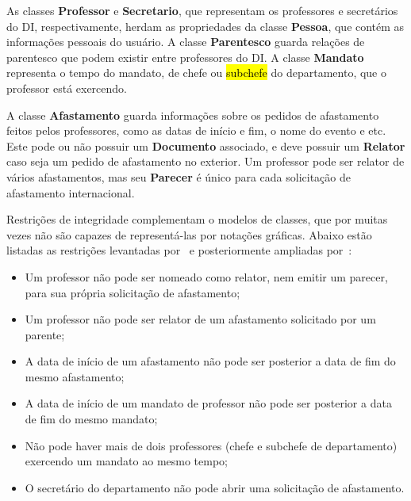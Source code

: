 As classes \textbf{Professor} e \textbf{Secretario}, que representam os professores
e secretários do DI, respectivamente, herdam as propriedades da classe \textbf{Pessoa},
que contém as informações pessoais do usuário. A classe \textbf{Parentesco} 
guarda relações de parentesco que podem existir entre professores do DI.
A classe \textbf{Mandato} representa o tempo do mandato, de chefe ou \hl{subchefe} do departamento,
que o professor está exercendo.


A classe \textbf{Afastamento} guarda informações sobre os pedidos de afastamento
feitos pelos professores, como as datas de início e fim, o nome do evento e etc.
Este pode ou não possuir um \textbf{Documento} associado, e deve possuir um \textbf{Relator}
caso seja um pedido de afastamento no exterior. Um professor pode ser relator de vários afastamentos,
mas seu \textbf{Parecer} é único para cada solicitação de afastamento internacional.


Restrições de integridade complementam o modelos de classes, que por muitas vezes não são
capazes de representá-las por notações gráficas. Abaixo estão listadas as restrições
levantadas por~ e posteriormente ampliadas por~:

\begin{itemize}
    \item Um professor não pode ser nomeado como relator, nem emitir um parecer, para sua própria solicitação de afastamento;
    \item Um professor não pode ser relator de um afastamento solicitado por um parente;
    \item A data de início de um afastamento não pode ser posterior a data de fim do mesmo afastamento;
    \item A data de início de um mandato de professor não pode ser posterior a data de fim do mesmo mandato;
    \item Não pode haver mais de dois professores (chefe e subchefe de departamento) exercendo um mandato ao mesmo tempo;
    \item O secretário do departamento não pode abrir uma solicitação de afastamento.
\end{itemize}
